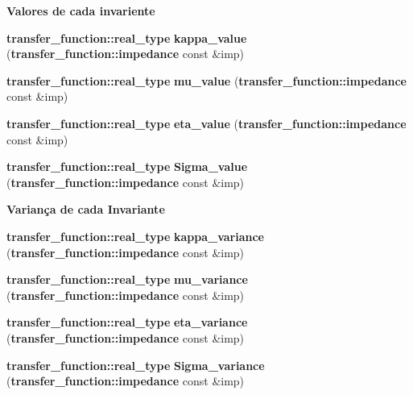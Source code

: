 \begin{Indent}{\bf Valores de cada invariente}\par
\begin{CompactItemize}
\item 
{\bf transfer\_\-function::real\_\-type} \textbf{kappa\_\-value} ({\bf transfer\_\-function::impedance} const \&imp)\label{namespaceerro__manual_1_1base__xi__eta_1_1bahr__invariant_e648802f842fcae13b31b8c7b648437d}

\item 
{\bf transfer\_\-function::real\_\-type} \textbf{mu\_\-value} ({\bf transfer\_\-function::impedance} const \&imp)\label{namespaceerro__manual_1_1base__xi__eta_1_1bahr__invariant_2c41be9b82c7c117efe59ef0600ee413}

\item 
{\bf transfer\_\-function::real\_\-type} \textbf{eta\_\-value} ({\bf transfer\_\-function::impedance} const \&imp)\label{namespaceerro__manual_1_1base__xi__eta_1_1bahr__invariant_4ce729291740a51347f341e66a412c2c}

\item 
{\bf transfer\_\-function::real\_\-type} \textbf{Sigma\_\-value} ({\bf transfer\_\-function::impedance} const \&imp)\label{namespaceerro__manual_1_1base__xi__eta_1_1bahr__invariant_aa72b84e1946d09bc6e0f588633962c3}

\end{CompactItemize}
\end{Indent}
\begin{Indent}{\bf Variança de cada Invariante}\par
\begin{CompactItemize}
\item 
{\bf transfer\_\-function::real\_\-type} \textbf{kappa\_\-variance} ({\bf transfer\_\-function::impedance} const \&imp)\label{namespaceerro__manual_1_1base__xi__eta_1_1bahr__invariant_f758a132c6aa540782e8e1882aef1c91}

\item 
{\bf transfer\_\-function::real\_\-type} \textbf{mu\_\-variance} ({\bf transfer\_\-function::impedance} const \&imp)\label{namespaceerro__manual_1_1base__xi__eta_1_1bahr__invariant_fdab8791eee5e491f168b7d8fc8203c7}

\item 
{\bf transfer\_\-function::real\_\-type} \textbf{eta\_\-variance} ({\bf transfer\_\-function::impedance} const \&imp)\label{namespaceerro__manual_1_1base__xi__eta_1_1bahr__invariant_ed6b175f976a0607a7f016504fbd142f}

\item 
{\bf transfer\_\-function::real\_\-type} \textbf{Sigma\_\-variance} ({\bf transfer\_\-function::impedance} const \&imp)\label{namespaceerro__manual_1_1base__xi__eta_1_1bahr__invariant_7b9e73e08d575bfb3565abf382c2dc53}

\end{CompactItemize}
\end{Indent}
